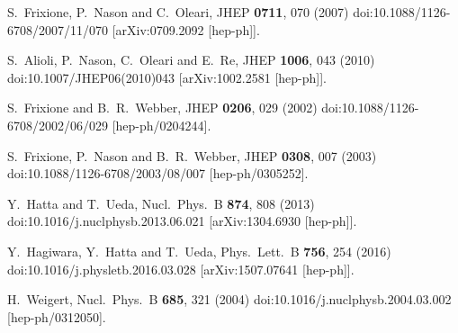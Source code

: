\documentclass[11pt,a4paper]{article}
\begin{document}
\begin{thebibliography}{99}
  S.~Frixione, P.~Nason and C.~Oleari,
  JHEP {\bf 0711}, 070 (2007)
  doi:10.1088/1126-6708/2007/11/070
  [arXiv:0709.2092 [hep-ph]].


  S.~Alioli, P.~Nason, C.~Oleari and E.~Re,
  JHEP {\bf 1006}, 043 (2010)
  doi:10.1007/JHEP06(2010)043
  [arXiv:1002.2581 [hep-ph]].


  S.~Frixione and B.~R.~Webber,
  JHEP {\bf 0206}, 029 (2002)
  doi:10.1088/1126-6708/2002/06/029
  [hep-ph/0204244].


  S.~Frixione, P.~Nason and B.~R.~Webber,
  JHEP {\bf 0308}, 007 (2003)
  doi:10.1088/1126-6708/2003/08/007
  [hep-ph/0305252].


  Y.~Hatta and T.~Ueda,
  Nucl.\ Phys.\ B {\bf 874}, 808 (2013)
  doi:10.1016/j.nuclphysb.2013.06.021
  [arXiv:1304.6930 [hep-ph]].


  Y.~Hagiwara, Y.~Hatta and T.~Ueda,
  Phys.\ Lett.\ B {\bf 756}, 254 (2016)
  doi:10.1016/j.physletb.2016.03.028
  [arXiv:1507.07641 [hep-ph]].


  H.~Weigert,
  Nucl.\ Phys.\ B {\bf 685}, 321 (2004)
  doi:10.1016/j.nuclphysb.2004.03.002
  [hep-ph/0312050].



\end{thebibliography}
\end{document}
